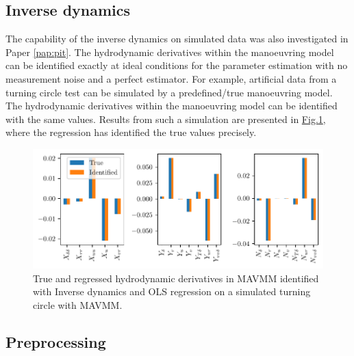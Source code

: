 \subsection{Inverse dynamics}
\label{\detokenize{06.40_results_inverse_dynamics:inverse-dynamics}}\label{\detokenize{06.40_results_inverse_dynamics::doc}}
The capability of the inverse dynamics on simulated data was also investigated in Paper \ref{pap:pit}. The hydrodynamic derivatives within the manoeuvring model can be identified exactly at ideal conditions for the parameter estimation with no measurement noise and a perfect estimator. For example, artificial data from a turning circle test can be simulated by a predefined/true manoeuvring model. The hydrodynamic derivatives within the manoeuvring model can be identified with the same values. Results from such a simulation are presented in \hyperref[\detokenize{06.40_results_inverse_dynamics:fig-bar-parameters}]{Fig.\@ \ref{\detokenize{06.40_results_inverse_dynamics:fig-bar-parameters}}}, where the regression has identified the true values precisely.
\begin{figure}[h!]
\centering
\includegraphics[width=\linewidth]{kappa/images/5.pdf}
\caption{True and regressed hydrodynamic derivatives in MAVMM identified with Inverse dynamics and OLS regression on a simulated turning circle with MAVMM.}\label{\detokenize{06.40_results_inverse_dynamics:fig-bar-parameters}}\end{figure}


\subsection{Preprocessing}
\label{\detokenize{06.31_results_noise:preprocessing}}\label{\detokenize{06.31_results_noise::doc}}

